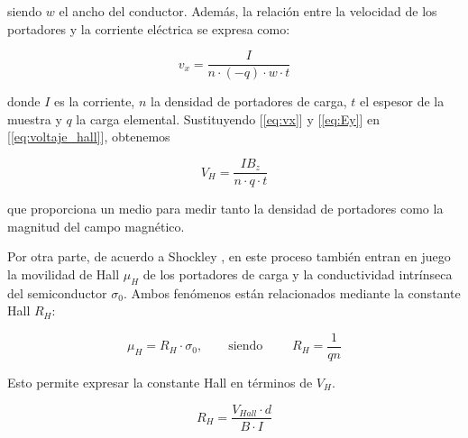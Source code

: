	\vspace{\baselineskip}
	
	siendo $w$ el ancho del conductor. Además, la relación entre la velocidad de los portadores y la corriente eléctrica se expresa como:
	
	
	\begin{equation} \label{eq:vx}
		v_x = \frac{I}{n\cdot (-q) \cdot w \cdot t}
	\end{equation}
	
	\vspace{\baselineskip}
	
	donde $I$ es la corriente, $n$ la densidad de portadores de carga, $t$ el espesor de la muestra y $q$ la carga elemental. Sustituyendo [\ref{eq:vx}] y [\ref{eq:Ey}] en [\ref{eq:voltaje_hall}], obtenemos
	
	\vspace{\baselineskip}
	
	\begin{equation} \label{eq:final_VH}
		V_H = \frac{I B_z}{n\cdot q \cdot t}
	\end{equation}
	
	\vspace{\baselineskip}
	
	que proporciona un medio para medir tanto la densidad de portadores como la magnitud del campo magnético.	

	\vspace{\baselineskip}
	
	Por otra parte, de acuerdo a Shockley \cite{Shockley1950}, en este proceso también entran en juego la movilidad de Hall $\mu_H$ de los portadores de carga y la conductividad intrínseca del semiconductor $\sigma_0$. Ambos fenómenos están relacionados mediante la constante Hall $R_H$:
		
	\vspace{\baselineskip}
		
	\begin{equation} \label{eq:mu_H}
		\mu_H = R_H \cdot \sigma_0, \qquad \text{siendo } \qquad R_H = \frac{1}{qn}
	\end{equation}
	
	\vspace{\baselineskip}
	
	Esto permite expresar la constante Hall en términos de $V_H$.
	
	\vspace{\baselineskip}
		
	\begin{equation} \label{eq:RH}
		R_H = \frac{V_{Hall}\cdot d}{B\cdot I}
	\end{equation}
	
